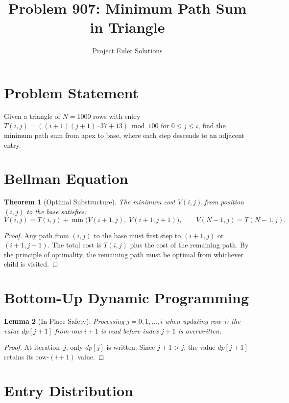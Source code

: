 \documentclass[11pt]{article}
\title{Problem 907: Minimum Path Sum in Triangle}
\author{Project Euler Solutions}
\date{}
\newtheorem{theorem}{Theorem}
\newtheorem{lemma}[theorem]{Lemma}
\begin{document}
\maketitle

\section{Problem Statement}

Given a triangle of $N = 1000$ rows with entry $T(i,j) = ((i+1)(j+1)\cdot 37 + 13) \bmod 100$ for $0 \le j \le i$, find the minimum path sum from apex to base, where each step descends to an adjacent entry.

\section{Bellman Equation}

\begin{theorem}[Optimal Substructure]
The minimum cost $V(i,j)$ from position $(i,j)$ to the base satisfies:
\[
V(i,j) = T(i,j) + \min\bigl(V(i+1,j),\; V(i+1,j+1)\bigr), \qquad V(N-1,j) = T(N-1,j).
\]
\end{theorem}

\begin{proof}
Any path from $(i,j)$ to the base must first step to $(i+1,j)$ or $(i+1,j+1)$. The total cost is $T(i,j)$ plus the cost of the remaining path. By the principle of optimality, the remaining path must be optimal from whichever child is visited.
\end{proof}

\section{Bottom-Up Dynamic Programming}

\begin{lemma}[In-Place Safety]
Processing $j = 0, 1, \ldots, i$ when updating row~$i$: the value $dp[j+1]$ from row $i+1$ is read before index $j+1$ is overwritten.
\end{lemma}

\begin{proof}
At iteration~$j$, only $dp[j]$ is written. Since $j+1 > j$, the value $dp[j+1]$ retains its row-$(i+1)$ value.
\end{proof}

\section{Entry Distribution}
\end{document}
